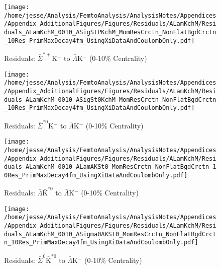 \documentclass[/home/jesse/Analysis/FemtoAnalysis/AnalysisNotes/AnalysisNoteJBuxton.tex]{subfiles}
\begin{document}
\begin{figure}[h]
  \centering
  \texttt{[image: /home/jesse/Analysis/FemtoAnalysis/AnalysisNotes/Appendices/Appendix\_AdditionalFigures/Figures/Residuals/ALamKchM/Residuals\_ALamKchM\_0010\_ASigStPKchM\_MomResCrctn\_NonFlatBgdCrctn\_10Res\_PrimMaxDecay4fm\_UsingXiDataAndCoulombOnly.pdf]}
  \caption[Residuals: $\bar{\Sigma}^{*+}$K$^{-}$ to $\bar{\Lambda}$K$^{-}$ (0-10\% Centrality)]{Residuals: $\bar{\Sigma}^{*+}$K$^{-}$ to $\bar{\Lambda}$K$^{-}$ (0-10\% Centrality)}
  \label{fig:Res_ALamKchM_0010_ASigStPKchM}
\end{figure}

\begin{figure}[h]
  \centering
  \texttt{[image: /home/jesse/Analysis/FemtoAnalysis/AnalysisNotes/Appendices/Appendix\_AdditionalFigures/Figures/Residuals/ALamKchM/Residuals\_ALamKchM\_0010\_ASigSt0KchM\_MomResCrctn\_NonFlatBgdCrctn\_10Res\_PrimMaxDecay4fm\_UsingXiDataAndCoulombOnly.pdf]}
  \caption[Residuals: $\bar{\Sigma}^{*0}$K$^{-}$ to $\bar{\Lambda}$K$^{-}$ (0-10\% Centrality)]{Residuals: $\bar{\Sigma}^{*0}$K$^{-}$ to $\bar{\Lambda}$K$^{-}$ (0-10\% Centrality)}
  \label{fig:Res_ALamKchM_0010_ASigSt0KchM}
\end{figure}


\begin{figure}[h]
  \centering
  \texttt{[image: /home/jesse/Analysis/FemtoAnalysis/AnalysisNotes/Appendices/Appendix\_AdditionalFigures/Figures/Residuals/ALamKchM/Residuals\_ALamKchM\_0010\_ALamAKSt0\_MomResCrctn\_NonFlatBgdCrctn\_10Res\_PrimMaxDecay4fm\_UsingXiDataAndCoulombOnly.pdf]}
  \caption[Residuals: $\bar{\Lambda}\bar{\mathrm{K}}^{*0}$ to $\bar{\Lambda}$K$^{-}$ (0-10\% Centrality)]{Residuals: $\bar{\Lambda}\bar{\mathrm{K}}^{*0}$ to $\bar{\Lambda}$K$^{-}$ (0-10\% Centrality)}
  \label{fig:Res_ALamKchM_0010_ALamAKSt0}
\end{figure}


\begin{figure}[h]
  \centering
  \texttt{[image: /home/jesse/Analysis/FemtoAnalysis/AnalysisNotes/Appendices/Appendix\_AdditionalFigures/Figures/Residuals/ALamKchM/Residuals\_ALamKchM\_0010\_ASigma0AKSt0\_MomResCrctn\_NonFlatBgdCrctn\_10Res\_PrimMaxDecay4fm\_UsingXiDataAndCoulombOnly.pdf]}
  \caption[Residuals: $\bar{\Sigma}^{0}\bar{\mathrm{K}}^{*0}$ to $\bar{\Lambda}$K$^{-}$ (0-10\% Centrality)]{Residuals: $\bar{\Sigma}^{0}\bar{\mathrm{K}}^{*0}$ to $\bar{\Lambda}$K$^{-}$ (0-10\% Centrality)}
  \label{fig:Res_ALamKchM_0010_ASig0AKSt0}
\end{figure}
\end{document}
